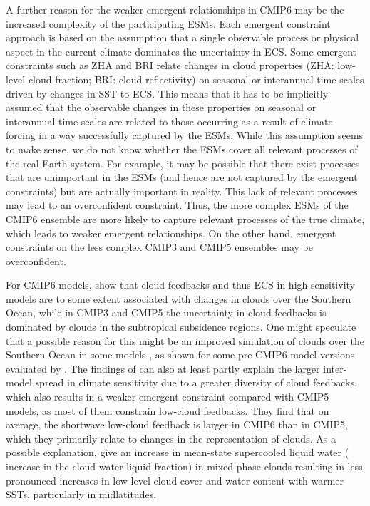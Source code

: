 A further reason for the weaker emergent relationships in \acs{CMIP}6 may be
the increased complexity of the participating \acp{ESM}. Each emergent
constraint approach is based on the assumption that a single observable process
or physical aspect in the current climate dominates the uncertainty in
\ac{ECS}. Some emergent constraints such as ZHA and BRI relate changes in cloud
properties (ZHA: low-level cloud fraction; BRI: cloud reflectivity) on seasonal
or interannual time scales driven by changes in \ac{SST} to \ac{ECS}. This
means that it has to be implicitly assumed that the observable changes in these
properties on seasonal or interannual time scales are related to those
occurring as a result of climate forcing in a way successfully captured by the
\acp{ESM}. While this assumption seems to make sense, we do not know whether
the \acp{ESM} cover all relevant processes of the real Earth system. For
example, it may be possible that there exist processes that are unimportant in
the \acp{ESM} (and hence are not captured by the emergent constraints) but are
actually important in reality. This lack of relevant processes may lead to an
overconfident constraint. Thus, the more complex \acp{ESM} of the \acs{CMIP}6
ensemble are more likely to capture relevant processes of the true climate,
which leads to weaker emergent relationships. On the other hand, emergent
constraints on the less complex \acs{CMIP}3 and \acs{CMIP}5 ensembles may be
overconfident.

For \acs{CMIP}6 models, \textcite{Zelinka2020} show that cloud feedbacks and
thus \ac{ECS} in high-sensitivity models are to some extent associated with
changes in clouds over the Southern Ocean, while in \acs{CMIP}3 and \acs{CMIP}5
the uncertainty in cloud feedbacks is dominated by clouds in the subtropical
subsidence regions. One might speculate that a possible reason for this might
be an improved simulation of clouds over the Southern Ocean in some models
\autocite{BodasSalcedo2019, Gettelman2019}, as shown for some pre-\acs{CMIP}6
model versions evaluated by \textcite{Lauer2018}. The findings of
\textcite{Zelinka2020} can also at least partly explain the larger inter-model
spread in climate sensitivity due to a greater diversity of cloud feedbacks,
which also results in a weaker emergent constraint compared with \acs{CMIP}5
models, as most of them constrain low-cloud feedbacks. They find that on
average, the shortwave low-cloud feedback is larger in \acs{CMIP}6 than in
\acs{CMIP}5, which they primarily relate to changes in the representation of
clouds. As a possible explanation, \textcite{Zelinka2020} give an increase in
mean-state supercooled liquid water (\ie{} increase in the cloud water liquid
fraction) in mixed-phase clouds resulting in less pronounced increases in
low-level cloud cover and water content with warmer \acp{SST}, particularly in
midlatitudes.

